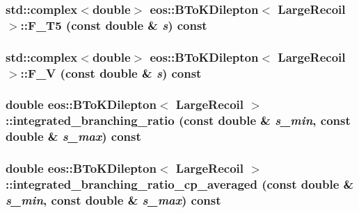 \label{classeos_1_1BToKDilepton_3_01LargeRecoil_01_4_a7b0d805213f319d4de219ba0333d25b6}
\hypertarget{classeos_1_1BToKDilepton_3_01LargeRecoil_01_4_ae4b7200f7f47324a77c729f620ef1858}{
\subsubsection[{F\_\-T5}]{\setlength{\rightskip}{0pt plus 5cm}std::complex$<$double$>$ eos::BToKDilepton$<$ {\bf LargeRecoil} $>$::F\_\-T5 (const double \& {\em s}) const}}
\label{classeos_1_1BToKDilepton_3_01LargeRecoil_01_4_ae4b7200f7f47324a77c729f620ef1858}
\hypertarget{classeos_1_1BToKDilepton_3_01LargeRecoil_01_4_af59944944455c9411ba212f58976633a}{
\subsubsection[{F\_\-V}]{\setlength{\rightskip}{0pt plus 5cm}std::complex$<$double$>$ eos::BToKDilepton$<$ {\bf LargeRecoil} $>$::F\_\-V (const double \& {\em s}) const}}
\label{classeos_1_1BToKDilepton_3_01LargeRecoil_01_4_af59944944455c9411ba212f58976633a}
\hypertarget{classeos_1_1BToKDilepton_3_01LargeRecoil_01_4_ab42894d5d92d65801033f341be792882}{
\subsubsection[{integrated\_\-branching\_\-ratio}]{\setlength{\rightskip}{0pt plus 5cm}double eos::BToKDilepton$<$ {\bf LargeRecoil} $>$::integrated\_\-branching\_\-ratio (const double \& {\em s\_\-min}, \/  const double \& {\em s\_\-max}) const}}
\label{classeos_1_1BToKDilepton_3_01LargeRecoil_01_4_ab42894d5d92d65801033f341be792882}
\hypertarget{classeos_1_1BToKDilepton_3_01LargeRecoil_01_4_a6053c38968017aaaeadfd4ef86bfa0b5}{
\subsubsection[{integrated\_\-branching\_\-ratio\_\-cp\_\-averaged}]{\setlength{\rightskip}{0pt plus 5cm}double eos::BToKDilepton$<$ {\bf LargeRecoil} $>$::integrated\_\-branching\_\-ratio\_\-cp\_\-averaged (const double \& {\em s\_\-min}, \/  const double \& {\em s\_\-max}) const}}
